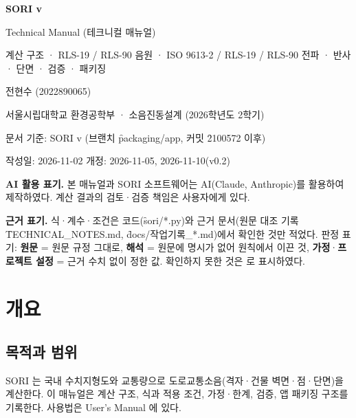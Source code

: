 \documentclass[10.5pt,a4paper]{article}
\begin{document}
\sloppy

\begin{titlepage}
\centering\vspace*{40mm}
{\sffamily\Huge\bfseries\color{navy} SORI v\soriversion\par}
\vspace{4mm}
{\sffamily\LARGE Technical Manual (테크니컬 매뉴얼)\par}
\vspace{6mm}
{\sffamily\large 계산 구조 · RLS-19 / RLS-90 음원 · ISO 9613-2 / RLS-19 / RLS-90 전파 · 반사 · 단면 · 검증 · 패키징\par}
\vspace{20mm}
{\large 전현수 (2022890065)\par}
\vspace{2mm}
{서울시립대학교 환경공학부 · 소음진동설계 (2026학년도 2학기)\par}
\vspace{10mm}
{문서 기준: SORI v\soriversion{} (브랜치 \f{packaging/app}, 커밋 \f{2100572} 이후)\par}
{작성일: 2026-11-02 \quad 개정: 2026-11-05, 2026-11-10(v0.2)\par}
\vfill
\begin{minipage}{0.85\textwidth}\small
\textbf{AI 활용 표기.} 본 매뉴얼과 SORI 소프트웨어는 AI(Claude, Anthropic)를 활용하여 제작하였다. 계산 결과의 검토·검증 책임은 사용자에게 있다.\par\vspace{2mm}
\textbf{근거 표기.} 식·계수·조건은 코드(\f{sori/*.py})와 근거 문서(원문 대조 기록 \f{TECHNICAL\_NOTES.md}, \f{docs/작업기록\_*.md})에서 확인한 것만 적었다. 판정 표기: \textbf{원문} = 원문 규정 그대로, \textbf{해석} = 원문에 명시가 없어 원칙에서 이끈 것, \textbf{가정}·\textbf{프로젝트 설정} = 근거 수치 없이 정한 값. 확인하지 못한 것은 \nob{}로 표시하였다.
\end{minipage}
\end{titlepage}

\tableofcontents
\clearpage

\section{개요}

\subsection{목적과 범위}
SORI 는 국내 수치지형도와 교통량으로 도로교통소음(격자·건물 벽면·점·단면)을 계산한다. 이 매뉴얼은 계산 구조, 식과 적용 조건, 가정·한계, 검증, 앱 패키징 구조를 기록한다. 사용법은 User's Manual 에 있다.
\end{document}
